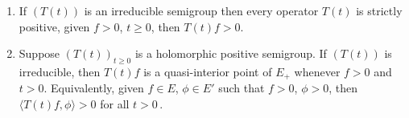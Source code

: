\begin{theorem}\label{thm:c3-3.2}
	\begin{enumerate}[\upshape (i)]
	\item
 	If $(T(t))$ is an irreducible semigroup then every operator $T(t)$ is strictly positive, \ie 
	given $f > 0$, $t \geq 0$, then $T(t)f > 0$.
	
	\item 
	Suppose $(T(t))_{t\geq 0}$ is a holomorphic positive semigroup.
	If $(T(t))$ is irreducible, then $T(t)f$ is a quasi-interior point of $E_{+}$ whenever $f > 0$ and $t > 0$.
	Equivalently, given $f \in E$, $\phi \in E'$ such that $f > 0$, $\phi > 0$, then $\langle T(t)f,\phi \rangle > 0$ for all $t > 0$\,.
	\end{enumerate}
\end{theorem}

